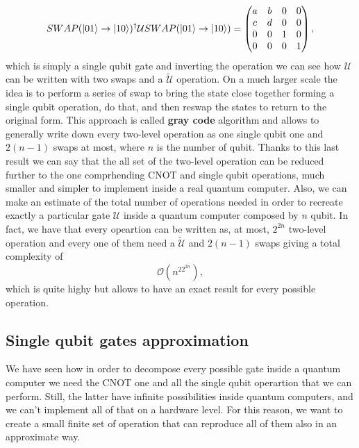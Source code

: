 {    \begin{equation}
        SWAP(\ket{01}\to \ket{10})^\dagger\mathcal{U}SWAP(\ket{01}\to \ket{10}) = \begin{pmatrix}
            a & b & 0 & 0\\
            c & d & 0 & 0\\
            0 & 0 & 1 & 0\\
            0 & 0 & 0 & 1
        \end{pmatrix},
    \end{equation}
    which is simply a single qubit gate and inverting the operation we can see how $\mathcal{U}$ can be written with two swaps and a $\tilde{\mathcal{U}}$ operation. On a much larger scale the idea is to perform a series of swap to bring the state close together forming a single qubit operation, do that, and then reswap the states to return to the original form. This approach is called \textbf{gray code} algorithm and allows to generally write down every two-level operation as one single qubit one and $2(n-1)$ swaps at most, where $n$ is the number of qubit.
}
\noindent
Thanks to this last result we can say that the all set of the two-level operation can be reduced further to the one comprhending CNOT and single qubit operations, much smaller and simpler to implement inside a real quantum computer. Also, we can make an estimate of the total number of operations needed in order to recreate exactly a particular gate $\mathcal{U}$ inside a quantum computer composed by $n$ qubit. In fact, we have that every opeartion can be written as, at most, $2^{2n}$ two-level operation and every one of them need a $\tilde{\mathcal{U}}$ and $2(n - 1)$ swaps giving a total complexity of
\begin{equation}
    \mathcal{O}(n^22^{2n}),
\end{equation} 
which is quite highy but allows to have an exact result for every possible operation.

\subsection{Single qubit gates approximation}

We have seen how in order to decompose every possible gate inside a quantum computer we need the CNOT one and all the single qubit operartion that we can perform. Still, the latter have infinite possibilities inside quantum computers, and we can't implement all of that on a hardware level. For this reason, we want to create a small finite set of operation that can reproduce all of them also in an approximate way.

